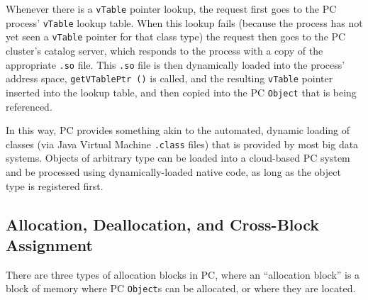 Whenever there is a \texttt{vTable} pointer lookup, the request first goes to the PC process' \texttt{vTable} lookup table.  When this 
lookup fails (because the process has not yet seen a \texttt{vTable} pointer for that class
type) the request then goes to the PC cluster's catalog server, which responds to the process with a copy of the appropriate \texttt{.so} file.  This 
\texttt{.so} file is then 
dynamically loaded into the process' address space, \texttt{getVTablePtr ()} is called, 
and the resulting \texttt{vTable} pointer inserted into the lookup table, and then copied into the PC \texttt{Object} that is being referenced.  

In this way, PC provides something akin to the automated,
dynamic loading of classes (via Java Virtual Machine \texttt{.class} files) that is
provided by most big data systems.  
Objects of arbitrary type can be loaded into a cloud-based PC system and be processed using dynamically-loaded native code, as long
as the object type is registered first.

\subsection{Allocation, Deallocation, and Cross-Block Assignment}

There are three types of allocation blocks in PC, where an ``allocation block'' is a block of memory where PC \texttt{Object}s can be
allocated, or where they are located.

